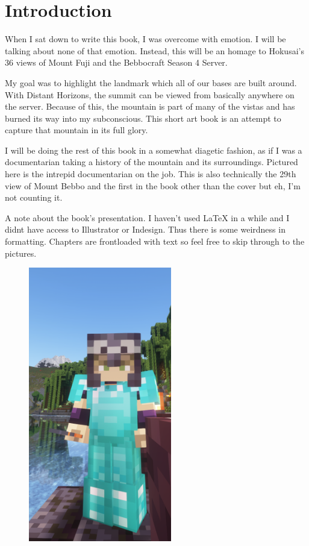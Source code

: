 \chapter*{Introduction}

When I sat down to write this book, I was overcome with emotion. I will be talking about none of that emotion.  Instead, this will be an homage to Hokusai's 36 views of Mount Fuji and the Bebbocraft Season 4 Server.

My goal was to highlight the landmark which all of our bases are built around. With Distant Horizons, the summit can be viewed from basically anywhere on the server. Because of this, the mountain is part of many of the vistas and has burned its way into my subconscious.  This short art book is an attempt to capture that mountain in its full glory.

I will be doing the rest of this book in a somewhat diagetic fashion, as if I was a documentarian taking a history of the mountain and its surroundings. Pictured here is the intrepid documentarian on the job. This is also technically the 29th view of Mount Bebbo and the first in the book other than the cover but eh, I'm not counting it. 

A note about the book's presentation. I haven't used LaTeX in a while and I didnt have access to Illustrator or Indesign. Thus there is some weirdness in formatting. Chapters are frontloaded with text so feel free to skip through to the pictures.\columnbreak
\begin{figure}
      \includegraphics[height=12cm, keepaspectratio]{me.png}%
\end{figure}